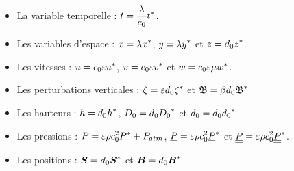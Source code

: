 \begin{itemize}[label=$\mybullet$]
	\item La variable temporelle : $\displaystyle t = \frac{\lambda}{c_0}{{t}^{*}}$.
	\item Les variables d'espace : $\displaystyle x = \lambda{{x}^{*}}$, $\displaystyle y = \lambda{{y}^{*}}$ et $\displaystyle z = d_0{{z}^{*}}$.
	\item Les vitesses : $\displaystyle u = c_0 \varepsilon {{u}^{*}}$, $\displaystyle v = c_0 \varepsilon {{v}^{*}}$ et $\displaystyle w = c_0 \varepsilon\mu {{w}^{*}}$.
	\item Les perturbations verticales : $\displaystyle \zeta = \varepsilon d_0 {{\zeta}^{*}}$ et $\displaystyle \mathfrak{B} = \beta d_0 {{\mathfrak{B}}^{*}}$
	\item Les hauteurs : $\displaystyle h= d_0 {{h}^{*}}$, $\displaystyle D_0 = d_0 {{D_0}^{*}}$ et $\displaystyle d_0 = d_0 {{d_0}^{*}}$
	\item Les pressions :  $\displaystyle P = \varepsilon\rho c_0^2 {{P}^{*}}+ P_{atm}$, $\displaystyle \underline{P} =\varepsilon \rho c_0^2 {{\underline{P}}^{*}}$ et $\displaystyle \underline{\underline{P}} =\varepsilon \rho c_0^2 {{\underline{\underline{P}}}^{*}}$.
	\item Les positions : $\displaystyle \boldsymbol{S} = d_0{{\boldsymbol{S}}^{*}}$ et $\displaystyle \boldsymbol{B} = d_0{{\boldsymbol{B}}^{*}}$
\end{itemize}

